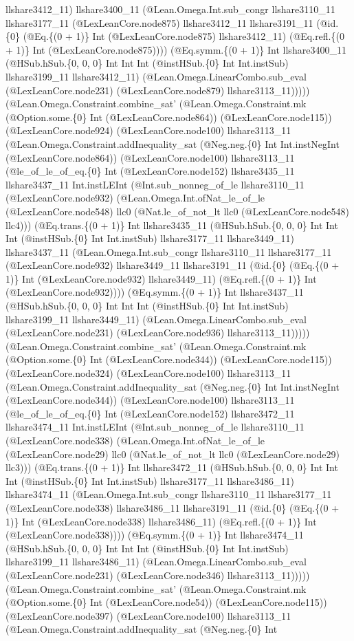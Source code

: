 \documentclass[11pt]{article}
\begin{document}
llshare3412\_11) llshare3400\_11 (@Lean.Omega.Int.sub\_congr llshare3110\_11 llshare3177\_11 (@LexLeanCore.node875) llshare3412\_11 llshare3191\_11 (@id.\{0\} (@Eq.\{(0 + 1)\} Int (@LexLeanCore.node875) llshare3412\_11) (@Eq.refl.\{(0 + 1)\} Int (@LexLeanCore.node875)))) (@Eq.symm.\{(0 + 1)\} Int llshare3400\_11 (@HSub.hSub.\{0, 0, 0\} Int Int Int (@instHSub.\{0\} Int Int.instSub) llshare3199\_11 llshare3412\_11) (@Lean.Omega.LinearCombo.sub\_eval (@LexLeanCore.node231) (@LexLeanCore.node879) llshare3113\_11))))) (@Lean.Omega.Constraint.combine\_sat' (@Lean.Omega.Constraint.mk (@Option.some.\{0\} Int (@LexLeanCore.node864)) (@LexLeanCore.node115)) (@LexLeanCore.node924) (@LexLeanCore.node100) llshare3113\_11 (@Lean.Omega.Constraint.addInequality\_sat (@Neg.neg.\{0\} Int Int.instNegInt (@LexLeanCore.node864)) (@LexLeanCore.node100) llshare3113\_11 (@le\_of\_le\_of\_eq.\{0\} Int (@LexLeanCore.node152) llshare3435\_11 llshare3437\_11 Int.instLEInt (@Int.sub\_nonneg\_of\_le llshare3110\_11 (@LexLeanCore.node932) (@Lean.Omega.Int.ofNat\_le\_of\_le (@LexLeanCore.node548) llc0 (@Nat.le\_of\_not\_lt llc0 (@LexLeanCore.node548) llc4))) (@Eq.trans.\{(0 + 1)\} Int llshare3435\_11 (@HSub.hSub.\{0, 0, 0\} Int Int Int (@instHSub.\{0\} Int Int.instSub) llshare3177\_11 llshare3449\_11) llshare3437\_11 (@Lean.Omega.Int.sub\_congr llshare3110\_11 llshare3177\_11 (@LexLeanCore.node932) llshare3449\_11 llshare3191\_11 (@id.\{0\} (@Eq.\{(0 + 1)\} Int (@LexLeanCore.node932) llshare3449\_11) (@Eq.refl.\{(0 + 1)\} Int (@LexLeanCore.node932)))) (@Eq.symm.\{(0 + 1)\} Int llshare3437\_11 (@HSub.hSub.\{0, 0, 0\} Int Int Int (@instHSub.\{0\} Int Int.instSub) llshare3199\_11 llshare3449\_11) (@Lean.Omega.LinearCombo.sub\_eval (@LexLeanCore.node231) (@LexLeanCore.node936) llshare3113\_11))))) (@Lean.Omega.Constraint.combine\_sat' (@Lean.Omega.Constraint.mk (@Option.some.\{0\} Int (@LexLeanCore.node344)) (@LexLeanCore.node115)) (@LexLeanCore.node324) (@LexLeanCore.node100) llshare3113\_11 (@Lean.Omega.Constraint.addInequality\_sat (@Neg.neg.\{0\} Int Int.instNegInt (@LexLeanCore.node344)) (@LexLeanCore.node100) llshare3113\_11 (@le\_of\_le\_of\_eq.\{0\} Int (@LexLeanCore.node152) llshare3472\_11 llshare3474\_11 Int.instLEInt (@Int.sub\_nonneg\_of\_le llshare3110\_11 (@LexLeanCore.node338) (@Lean.Omega.Int.ofNat\_le\_of\_le (@LexLeanCore.node29) llc0 (@Nat.le\_of\_not\_lt llc0 (@LexLeanCore.node29) llc3))) (@Eq.trans.\{(0 + 1)\} Int llshare3472\_11 (@HSub.hSub.\{0, 0, 0\} Int Int Int (@instHSub.\{0\} Int Int.instSub) llshare3177\_11 llshare3486\_11) llshare3474\_11 (@Lean.Omega.Int.sub\_congr llshare3110\_11 llshare3177\_11 (@LexLeanCore.node338) llshare3486\_11 llshare3191\_11 (@id.\{0\} (@Eq.\{(0 + 1)\} Int (@LexLeanCore.node338) llshare3486\_11) (@Eq.refl.\{(0 + 1)\} Int (@LexLeanCore.node338)))) (@Eq.symm.\{(0 + 1)\} Int llshare3474\_11 (@HSub.hSub.\{0, 0, 0\} Int Int Int (@instHSub.\{0\} Int Int.instSub) llshare3199\_11 llshare3486\_11) (@Lean.Omega.LinearCombo.sub\_eval (@LexLeanCore.node231) (@LexLeanCore.node346) llshare3113\_11))))) (@Lean.Omega.Constraint.combine\_sat' (@Lean.Omega.Constraint.mk (@Option.some.\{0\} Int (@LexLeanCore.node54)) (@LexLeanCore.node115)) (@LexLeanCore.node397) (@LexLeanCore.node100) llshare3113\_11 (@Lean.Omega.Constraint.addInequality\_sat (@Neg.neg.\{0\} Int 
\end{document}
